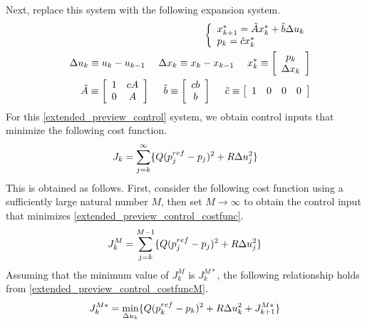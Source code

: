 Next, replace this system with the following expansion system.
\begin{eqnarray}
  && \left\{
  \begin{array}{l}
    x^\ast_{k+1} = \tilde{A} x^\ast_k + \tilde{b} \Delta u_k \\
    p_k = \tilde{c} x^\ast_k
  \end{array}
  \right. \eqlabel{extended_preview_control}\\
  && \Delta u_k \equiv u_k - u_{k-1} ~~~~ \Delta x_k \equiv x_k - x_{k-1} ~~~~ x^\ast_k \equiv \left[
    \begin{array}{c}
      p_k\\
      \Delta x_k
    \end{array}
    \right] \nonumber\\
  && \tilde{A} \equiv \left[
    \begin{array}{c c}
      1 & cA\\
      0 & A
    \end{array}
    \right] ~~~~ \tilde{b} \equiv \left[
    \begin{array}{c}
      cb\\
      b
    \end{array}
    \right] ~~~~ \tilde{c} \equiv \left[
    \begin{array}{c c c c}
      1 & 0 & 0 & 0
    \end{array}
    \right]\nonumber
\end{eqnarray}
For this \eqref{extended_preview_control} system, we obtain control inputs that minimize the following cost function.
\begin{eqnarray}
  J_k = \sum_{j=k}^{\infty} \{Q(p_{j}^{ref} - p_{j})^2 + R\Delta u_{j}^2\} \eqlabel{extended_preview_control_costfunc}
\end{eqnarray}
This is obtained as follows.
First, consider the following cost function using a sufficiently large natural number $M$, then set $M \rightarrow \infty$ to obtain the control input that minimizes \eqref{extended_preview_control_costfunc}.
\begin{eqnarray}
  J_k^M = \sum_{j=k}^{M-1} \{Q(p_{j}^{ref} - p_{j})^2 + R\Delta u_{j}^2\} \eqlabel{extended_preview_control_costfuncM}
\end{eqnarray}
Assuming that the minimum value of $J_k^M$ is $J_k^{M\ast}$, the following relationship holds from \eqref{extended_preview_control_costfuncM}.
\begin{eqnarray}
  J_k^{M\ast} = \min_{\Delta u_k} \{Q(p_k^{ref} - p_k)^2 + R\Delta u_k^2 + J_{k+1}^{M\ast}\}  \eqlabel{extended_preview_control_costfunc2}
\end{eqnarray}
